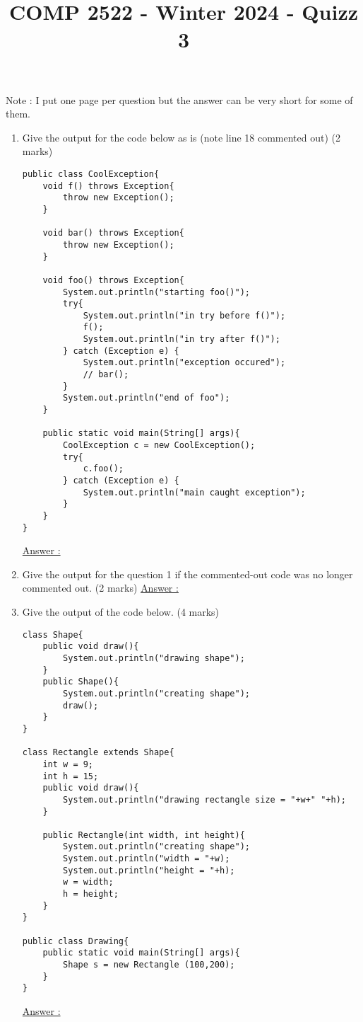 \documentclass{article}
\author{}
\date{}
\title{COMP 2522 - Winter 2024 - Quizz 3}
\begin{document}
\maketitle
Note : I put one page per question but the answer can be very short for some of them.
\begin{enumerate}
	\item Give the output for the code below as is (note line 18 commented out) (2 marks)
	\begin{lstlisting}
public class CoolException{
	void f() throws Exception{
		throw new Exception();
	}
	
	void bar() throws Exception{
		throw new Exception();
	}
	
	void foo() throws Exception{
		System.out.println("starting foo()");
		try{
			System.out.println("in try before f()");
			f();
			System.out.println("in try after f()");
		} catch (Exception e) {
			System.out.println("exception occured");
			// bar();
		}
		System.out.println("end of foo");
	}
	
	public static void main(String[] args){
		CoolException c = new CoolException();
		try{
			c.foo();
		} catch (Exception e) {
			System.out.println("main caught exception");
		}
	}
}
	\end{lstlisting}
	\underline{Answer :}
	\newpage
	\item Give the output for the question 1 if the commented-out code was no longer commented out. (2 marks)\newline
	\underline{Answer :}
	\newpage
	\item Give the output of the code below. (4 marks)
	\begin{lstlisting}
class Shape{
	public void draw(){
		System.out.println("drawing shape");
	}
	public Shape(){
		System.out.println("creating shape");
		draw();
	}
}

class Rectangle extends Shape{
	int w = 9;
	int h = 15;
	public void draw(){
		System.out.println("drawing rectangle size = "+w+" "+h);
	}
	
	public Rectangle(int width, int height){
		System.out.println("creating shape");
		System.out.println("width = "+w);
		System.out.println("height = "+h);
		w = width;
		h = height;
	}
}

public class Drawing{
	public static void main(String[] args){
		Shape s = new Rectangle (100,200);
	}
}
	\end{lstlisting}
	\underline{Answer :}
\end{enumerate}
\end{document}
